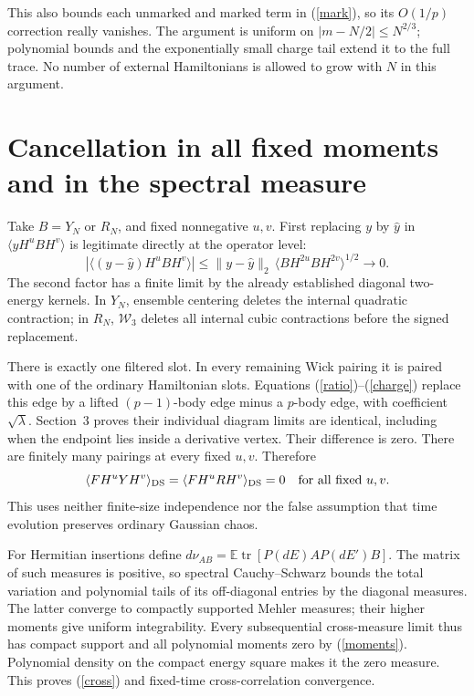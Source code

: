 \documentclass[11pt,a4paper]{article}
\newcommand{\E}{\mathbb E}
\newcommand{\tr}{\operatorname{tr}}
\newcommand{\av}[1]{\langle #1\rangle}
\newcommand{\W}{\mathcal W}
\begin{document}
This also bounds each unmarked and marked term in (\ref{mark}), so
its $O(1/p)$ correction really vanishes. The argument is uniform on
$|m-N/2|\leq N^{2/3}$; polynomial bounds and the exponentially small
charge tail extend it to the full trace. No number of external
Hamiltonians is allowed to grow with $N$ in this argument.

\newpage
\section{Cancellation in all fixed moments and in the spectral measure}
Take $B=Y_N$ or $R_N$, and fixed nonnegative $u,v$. First replacing
$y$ by $\widehat y$ in $\av{yH^u B H^v}$ is legitimate directly
at the operator level:
\begin{equation}
 |\av{(y-\widehat y)H^u B H^v}|
 \leq\|y-\widehat y\|_2\,
       \av{B H^{2u} B H^{2v}}^{1/2}\longrightarrow0.\label{bound}
\end{equation}
The second factor has a finite limit by the already established
diagonal two-energy kernels. In $Y_N$, ensemble centering deletes
the internal quadratic contraction; in $R_N$, $\W_3$ deletes all
internal cubic contractions before the signed replacement.

There is exactly one filtered slot. In every remaining Wick pairing
it is paired with one of the ordinary Hamiltonian slots. Equations
(\ref{ratio})--(\ref{charge}) replace this edge by a lifted
$(p-1)$-body edge minus a $p$-body edge, with coefficient
$\sqrt\lambda$. Section~3 proves their individual diagram limits
are identical, including when the endpoint lies inside a derivative
vertex. Their difference is zero. There are finitely many pairings
at every fixed $u,v$. Therefore
\begin{equation}
 \av{FH^uYH^v}_{\rm DS}=\av{FH^uRH^v}_{\rm DS}=0
 \quad\hbox{for all fixed }u,v.\label{moments}
\end{equation}
This uses neither finite-size independence nor the false assumption
that time evolution preserves ordinary Gaussian chaos.

For Hermitian insertions define
$d\nu_{AB}=\E\tr[P(dE)A P(dE')B]$. The matrix of such measures
is positive, so spectral Cauchy--Schwarz bounds the total variation
and polynomial tails of its off-diagonal entries by the diagonal
measures. The latter converge to compactly supported Mehler
measures; their higher moments give uniform integrability.
Every subsequential cross-measure limit thus has compact support
and all polynomial moments zero by (\ref{moments}). Polynomial
density on the compact energy square makes it the zero measure.
This proves (\ref{cross}) and fixed-time cross-correlation convergence.
\end{document}
